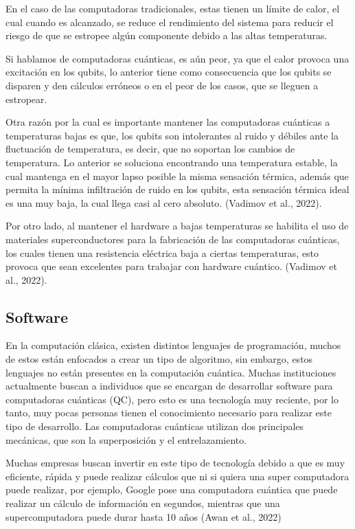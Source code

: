 \documentclass[twoside]{article}
\begin{document}
En el caso de las computadoras tradicionales, estas tienen un límite de calor, el cual cuando es alcanzado, se reduce el rendimiento del sistema para reducir el riesgo de que se estropee algún componente debido a las altas temperaturas.

 Si hablamos de computadoras cuánticas, es aún peor, ya que el calor provoca una excitación en los qubits, lo anterior tiene como consecuencia que los qubits se disparen y den cálculos erróneos o en el peor de los casos, que se lleguen a estropear. 

Otra razón por la cual es importante mantener las computadoras cuánticas a temperaturas bajas es que, los qubits son intolerantes al ruido y débiles ante la fluctuación de temperatura, es decir, que no soportan los cambios de temperatura. Lo anterior se soluciona encontrando una temperatura estable, la cual mantenga en el mayor lapso posible la misma sensación térmica, además que permita la mínima infiltración de ruido en los qubits, esta sensación térmica ideal es una muy baja, la cual llega casi al cero absoluto. (Vadimov et al., 2022).

Por otro lado, al mantener el hardware a bajas temperaturas se habilita el uso de materiales superconductores para la fabricación de las computadoras cuánticas, los cuales tienen una resistencia eléctrica baja a ciertas temperaturas, esto provoca que sean excelentes para trabajar con hardware cuántico. (Vadimov et al., 2022).


\subsection{Software}
En la computación clásica, existen distintos lenguajes de programación, muchos de estos están enfocados a crear un tipo de algoritmo, sin embargo, estos lenguajes no están presentes en la computación cuántica. Muchas instituciones actualmente buscan a individuos que se encargan de desarrollar software para computadoras cuánticas (QC), pero esto es una tecnología muy reciente, por lo tanto, muy pocas personas tienen el conocimiento necesario para realizar este tipo de desarrollo. Las computadoras cuánticas utilizan dos principales mecánicas, que son la superposición y el entrelazamiento. 

Muchas empresas buscan invertir en este tipo de tecnología debido a que es muy eficiente, rápida y puede realizar cálculos que ni si quiera una super computadora puede realizar, por ejemplo, Google pose una computadora cuántica que puede realizar un cálculo de información en segundos, mientras que una supercomputadora puede durar hasta 10 años (Awan et al., 2022)
\end{document}
